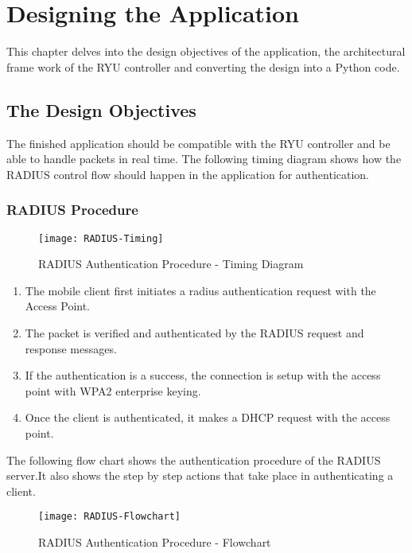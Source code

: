 \chapter{Designing the Application}\label{ch:application_design}
This chapter delves into the design objectives of the application, the architectural frame work of the RYU controller and converting the design into a Python code.

\section{The Design Objectives}

The finished application should be compatible with the RYU controller and be able to handle packets in real time. The following timing diagram shows how the RADIUS control flow should happen in the application for authentication.

\subsection{RADIUS Procedure} \label{RADIUS_Procedure}

\begin{figure}[H]
	\centering
	\texttt{[image: RADIUS-Timing]}
	\caption {RADIUS Authentication Procedure - Timing Diagram }
	\label{fig:Radius-Timing}
	\vspace{-10pt}
\end{figure}

\begin{enumerate}
	\item The mobile client first initiates a radius authentication request with the Access Point.
	\item The packet is verified and authenticated by the RADIUS request and response messages.
	\item If the authentication is a success, the connection is setup with the access point with WPA2 enterprise keying.
	\item Once the client is authenticated, it makes a DHCP request with the access point.   
	
\end{enumerate}
The following flow chart shows the authentication procedure of the RADIUS server.It also shows the step by step actions that take place in authenticating a client.
\begin{figure}[H]
	\centering
	\texttt{[image: RADIUS-Flowchart]}
	\caption {RADIUS Authentication Procedure - Flowchart }
	\label{fig:Radius-Flowchart}
	\vspace{-10pt}
\end{figure}
